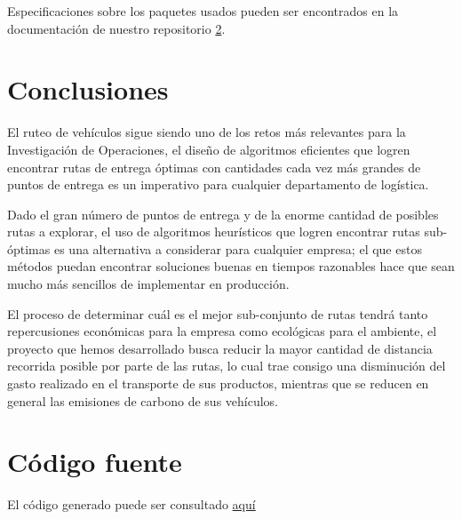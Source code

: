 \documentclass[journal]{IEEEtran}
\begin{document}
        Especificaciones sobre los paquetes usados pueden ser encontrados en la documentación de nuestro repositorio \ref{code:repo}.

    \section{Conclusiones}    
        
        El ruteo de vehículos sigue siendo uno de los retos más relevantes para la Investigación de Operaciones, el diseño de algoritmos eficientes que logren encontrar rutas de entrega óptimas con cantidades cada vez más grandes de puntos de entrega es un imperativo para cualquier departamento de logística.
        
        Dado el gran número de puntos de entrega y de la enorme cantidad de posibles rutas a explorar, el uso de algoritmos heurísticos que logren encontrar rutas sub-óptimas es una alternativa a considerar para cualquier empresa; el que estos métodos puedan encontrar soluciones buenas en tiempos razonables hace que sean mucho más sencillos de implementar en producción.
        
        El proceso de determinar cuál es el mejor sub-conjunto de rutas tendrá tanto repercusiones económicas para la empresa como ecológicas para el ambiente, el proyecto que hemos desarrollado busca reducir la mayor cantidad de distancia recorrida posible por parte de las rutas, lo cual trae consigo una disminución del gasto realizado en el transporte de sus productos, mientras que se reducen en general las emisiones de carbono de sus vehículos.
        
    \appendices
    
    \section{Código fuente}\label{code:repo}
    
        El código generado puede ser consultado \href{https://github.com/JuanEcheagaray75/capacitated-vrp}{aquí}
    
    
    
\end{document}
